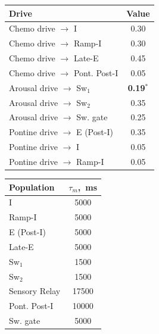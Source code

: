 \documentclass[pdflatex,sn-mathphys-ay]{sn-jnl}%
\theoremstyle{thmstyleone}%
\theoremstyle{thmstyletwo}%
\theoremstyle{thmstylethree}%
\begin{document}
\begin{center}

\begin{tabular}{lc}\hline
Drive & Value\\ \hline
Chemo drive $\to$ I & 0.30\\
Chemo drive $\to$ Ramp-I & 0.30\\
Chemo drive $\to$ Late-E & 0.45\\
Chemo drive $\to$ Pont. Post-I & 0.05\\
Arousal drive $\to$ Sw$_1$ & \textbf{0.19}$^{*}$\\
Arousal drive $\to$ Sw$_2$ & 0.35\\
Arousal drive $\to$ Sw. gate & 0.25\\
Pontine drive $\to$ E (Post-I) & 0.35\\
Pontine drive $\to$ I & 0.05\\
Pontine drive $\to$ Ramp-I & 0.05\\ \hline
\end{tabular}
\footnotesize 
\end{center}
\label{tbl: drives}

\begin{center}
\begin{tabular}{lc}\hline
Population & $\tau_m$,~ms \\ \hline
I & 5000 \\
Ramp-I & 5000 \\
E (Post-I) & 5000 \\
Late-E & 5000 \\
Sw$_1$ & 1500 \\
Sw$_2$ & 1500 \\
Sensory Relay & 17500 \\
Pont. Post-I & 10000 \\
Sw. gate & 5000 \\ \hline
\end{tabular}
\label{tbl: intrinsic_params}
\end{center}


\end{document}
